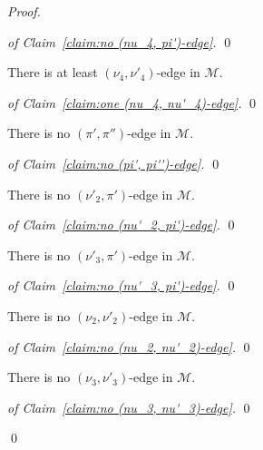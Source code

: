 \documentclass[a4paper,10pt]{llncs}
\begin{document}
\begin{proof}
  \begin{proof}[of Claim~\ref{claim:no (nu_4, pi')-edge}]
    \qed
  \end{proof}

  \begin{claim}
    \label{claim:one (nu_4, nu'_4)-edge}
    There is at least $(\nu_4, \nu'_4)$-edge in $\mathcal{M}$.
  \end{claim}

  \begin{proof}[of Claim~\ref{claim:one (nu_4, nu'_4)-edge}]
    \qed
  \end{proof}

  \begin{claim}
    \label{claim:no (pi', pi'')-edge}
    There is no $(\pi', \pi'')$-edge in $\mathcal{M}$.
  \end{claim}

  \begin{proof}[of Claim~\ref{claim:no (pi', pi'')-edge}]
    \qed
  \end{proof}

  \begin{claim}
    \label{claim:no (nu'_2, pi')-edge}
    There is no $(\nu'_2, \pi')$-edge in $\mathcal{M}$.
  \end{claim}

  \begin{proof}[of Claim~\ref{claim:no (nu'_2, pi')-edge}]
    \qed
  \end{proof}

  \begin{claim}
    \label{claim:no (nu'_3, pi')-edge}
    There is no $(\nu'_3, \pi')$-edge in $\mathcal{M}$.
  \end{claim}

  \begin{proof}[of Claim~\ref{claim:no (nu'_3, pi')-edge}]
    \qed
  \end{proof}

  \begin{claim}
    \label{claim:no (nu_2, nu'_2)-edge}
    There is no $(\nu_2, \nu'_2)$-edge in $\mathcal{M}$.
  \end{claim}

  \begin{proof}[of Claim~\ref{claim:no (nu_2, nu'_2)-edge}]
    \qed
  \end{proof}

  \begin{claim}
    \label{claim:no (nu_3, nu'_3)-edge}
    There is no $(\nu_3, \nu'_3)$-edge in $\mathcal{M}$.
  \end{claim}

  \begin{proof}[of Claim~\ref{claim:no (nu_3, nu'_3)-edge}]
    \qed
  \end{proof}
\qed
\end{proof}
\end{document}

